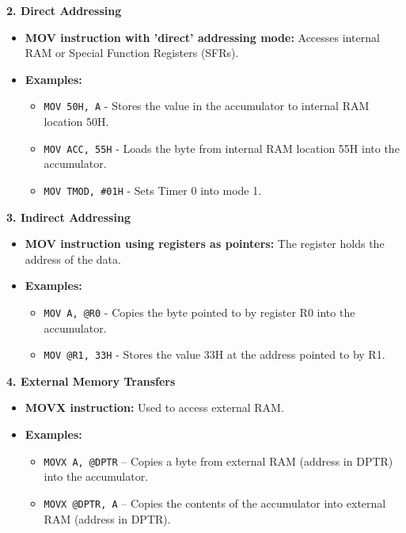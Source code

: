 \documentclass[
]{article}
\begin{document}
\textbf{2. Direct Addressing}

\begin{itemize}
\item
  \textbf{MOV instruction with 'direct' addressing mode:} Accesses
  internal RAM or Special Function Registers (SFRs).
\item
  \textbf{Examples:}

  \begin{itemize}
  \item
    \texttt{MOV\ 50H,\ A} - Stores the value in the accumulator to
    internal RAM location 50H.
  \item
    \texttt{MOV\ ACC,\ 55H} - Loads the byte from internal RAM location
    55H into the accumulator.
  \item
    \texttt{MOV\ TMOD,\ \#01H} - Sets Timer 0 into mode 1.
  \end{itemize}
\end{itemize}

\textbf{3. Indirect Addressing}

\begin{itemize}
\item
  \textbf{MOV instruction using registers as pointers:} The register
  holds the address of the data.
\item
  \textbf{Examples:}

  \begin{itemize}
  \item
    \texttt{MOV\ A,\ @R0} - Copies the byte pointed to by register R0
    into the accumulator.
  \item
    \texttt{MOV\ @R1,\ 33H} - Stores the value 33H at the address
    pointed to by R1.
  \end{itemize}
\end{itemize}

\textbf{4. External Memory Transfers}

\begin{itemize}
\item
  \textbf{MOVX instruction:} Used to access external RAM.
\item
  \textbf{Examples:}

  \begin{itemize}
  \item
    \texttt{MOVX\ A,\ @DPTR} -- Copies a byte from external RAM (address
    in DPTR) into the accumulator.
  \item
    \texttt{MOVX\ @DPTR,\ A} -- Copies the contents of the accumulator
    into external RAM (address in DPTR).
  \end{itemize}
\end{itemize}
\end{document}
